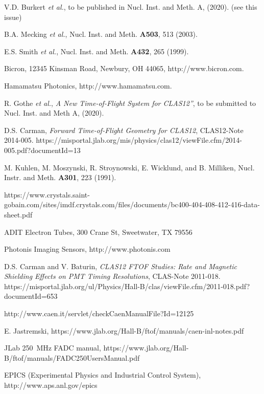 \documentclass{elsart}
\begin{document}
\begin{thebibliography}{99}

V.D. Burkert {\it et al.}, to be published in Nucl. Inst. and Meth. A, (2020). (see this issue)
  
B.A. Mecking {\it et al.}, Nucl. Inst. and Meth. {\bf A503}, 513 (2003).

E.S. Smith {\it et al.}, Nucl. Inst. and Meth. {\bf A432}, 265 (1999).

Bicron, 12345 Kinsman Road, Newbury, OH 44065, http://www.bicron.com.

Hamamatsu Photonics, http://www.hamamatsu.com.
  
R. Gothe {\it et al.}, {\it A New Time-of-Flight System for CLAS12''}, to be submitted to Nucl. Inst.
and Meth A, (2020).

D.S. Carman, {\it Forward Time-of-Flight Geometry for CLAS12}, CLAS12-Note 2014-005.
https://misportal.jlab.org/mis/physics/clas12/viewFile.cfm/2014-005.pdf?documentId=13

M. Kuhlen, M. Moszynski, R. Stroynowski, E. Wicklund, and B. Milliken, Nucl.  Instr. and Meth.
{\bf A301}, 223 (1991).

https://www.crystals.saint-gobain.com/sites/imdf.crystals.com/files/documents/bc400-404-408-412-416-data-sheet.pdf

ADIT Electron Tubes, 300 Crane St, Sweetwater, TX 79556
  
Photonis Imaging Sensors, http://www.photonis.com

D.S. Carman and V. Baturin, {\it CLAS12 FTOF Studies: Rate and Magnetic Shielding Effects on PMT Timing
Resolutions}, CLAS-Note 2011-018.\\
https://misportal.jlab.org/ul/Physics/Hall-B/clas/viewFile.cfm/2011-018.pdf?documentId=653
  
http://www.caen.it/servlet/checkCaenManualFile?Id=12125
  
E. Jastremski, https://www.jlab.org/Hall-B/ftof/manuals/caen-inl-notes.pdf

JLab 250~MHz FADC manual, https://www.jlab.org/Hall-B/ftof/manuals/FADC250UsersManual.pdf
  
EPICS (Experimental Physics and Industrial Control System),\\ http://www.aps.anl.gov/epics


\end{thebibliography}
\end{document}
